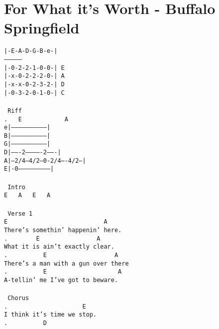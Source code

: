 \newpage
\section{For What it's Worth - Buffalo Springfield}
\label{For What it's Worth - Buffalo Springfield}
\texttt{|-E-A-D-G-B-e-|\\
---------------\\
|-0-2-2-1-0-0-|\ E\\
|-x-0-2-2-2-0-|\ A\\
|-x-x-0-2-3-2-|\ D\\
|-0-3-2-0-1-0-|\ C\\
\\
\lbrack\ Riff\rbrack\\
.\ \ \ E\ \ \ \ \ \ \ \ \ \ \ \ A\\
e|-----------------------------|\\
B|-----------------------------|\\
G|-----------------------------|\\
D|-------2-------------2-------|\\
A|---2/4---4/2--0-2/4----4/2---|\\
E|-0---------------------------|\\
\\
\lbrack\ Intro\rbrack\\
E\ \ \ A\ \ \ E\ \ \ A\\
\\
\lbrack\ Verse\ 1\rbrack\\
E\ \ \ \ \ \ \ \ \ \ \ \ \ \ \ \ \ \ \ \ \ \ \ \ \ \ \ A\\
There's\ somethin'\ happenin'\ here.\\
.\ \ \ \ \ \ \ \ E\ \ \ \ \ \ \ \ \ \ \ \ \ \ \ \ A\\
What\ it\ is\ ain't\ exactly\ clear.\\
.\ \ \ \ \ \ \ \ \ \ E\ \ \ \ \ \ \ \ \ \ \ \ \ \ \ \ \ \ \ A\\
There's\ a\ man\ with\ a\ gun\ over\ there\\
.\ \ \ \ \ \ \ \ \ \ E\ \ \ \ \ \ \ \ \ \ \ \ \ \ \ \ \ \ \ \ A\\
A-tellin'\ me\ I've\ got\ to\ beware.\\
\\
\lbrack\ Chorus\rbrack\\
.\ \ \ \ \ \ \ \ \ \ \ \ \ \ \ \ \ \ \ \ \ E\\
I\ think\ it's\ time\ we\ stop.\\
.\ \ \ \ \ \ \ \ \ \ D\\
}

